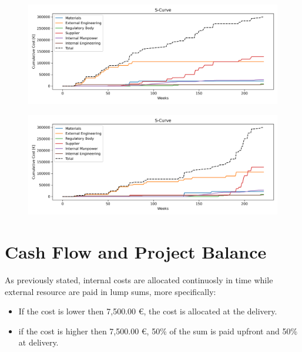 \begin{figure}[p]
    \centering
            \begin{minipage}{\textwidth}
        \centering
        \includegraphics[width=\textwidth]{../s_curve_E.png}
        \label{fig:scurve_early}
    \end{minipage}\hfill
    \begin{minipage}{\textwidth}
        \centering
        \includegraphics[width=\textwidth]{../s_curve_L.png}
        \label{fig:scurve_late}
    \end{minipage}
\end{figure}


\section{Cash Flow and Project Balance}
As previously stated, internal costs are allocated continuosly in time while external resource are paid in lump sums, more specifically:
\begin{itemize}
    \item If the cost is lower then 7,500.00 €, the cost is allocated at the delivery.
    \item if the cost is higher then 7,500.00 €, 50\% of the sum is paid upfront and 50\% at delivery.
\end{itemize}

